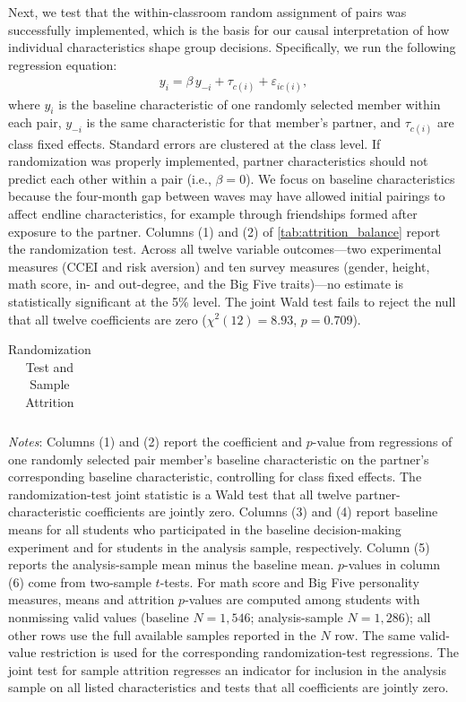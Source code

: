\documentclass[11 pt]{article}
\begin{document}
Next, we test that the within-classroom random assignment of pairs was successfully implemented, which is the basis for our causal interpretation of how individual characteristics shape group decisions. Specifically, we run the following regression equation:
\begin{align}\label{eqn:randomization}
y_{i} = \beta\, y_{-i} + \tau_{c(i)} + \varepsilon_{ic(i)},
\end{align}
where $y_i$ is the baseline characteristic of one randomly selected member within each pair, $y_{-i}$ is the same characteristic for that member's partner, and $\tau_{c(i)}$ are class fixed effects. Standard errors are clustered at the class level. If randomization was properly implemented, partner characteristics should not predict each other within a pair (i.e., $\beta = 0$). We focus on baseline characteristics because the four-month gap between waves may have allowed initial pairings to affect endline characteristics, for example through friendships formed after exposure to the partner. Columns (1) and (2) of \autoref{tab:attrition_balance} report the randomization test. Across all twelve variable outcomes---two experimental measures (CCEI and risk aversion) and ten survey measures (gender, height, math score, in- and out-degree, and the Big Five traits)---no estimate is statistically significant at the 5\% level. The joint Wald test fails to reject the null that all twelve coefficients are zero ($\chi^{2}(12) = 8.93$, $p = 0.709$).

\begin{table}[h!]
\centering
\caption{Randomization Test and Sample Attrition}
\label{tab:attrition_balance}
\begin{tabular}{lcccccc}
\toprule \hline

\end{tabular}
\begin{minipage}{\textwidth}
{\footnotesize \emph{Notes}: Columns (1) and (2) report the coefficient and $p$-value from regressions of one randomly selected pair member's baseline characteristic on the partner's corresponding baseline characteristic, controlling for class fixed effects. The randomization-test joint statistic is a Wald test that all twelve partner-characteristic coefficients are jointly zero. Columns (3) and (4) report baseline means for all students who participated in the baseline decision-making experiment and for students in the analysis sample, respectively. Column (5) reports the analysis-sample mean minus the baseline mean. $p$-values in column (6) come from two-sample $t$-tests. For math score and Big Five personality measures, means and attrition $p$-values are computed among students with nonmissing valid values (baseline $N=1,546$; analysis-sample $N=1,286$); all other rows use the full available samples reported in the $N$ row. The same valid-value restriction is used for the corresponding randomization-test regressions. The joint test for sample attrition regresses an indicator for inclusion in the analysis sample on all listed characteristics and tests that all coefficients are jointly zero.}
\end{minipage}
\end{table}
\end{document}
